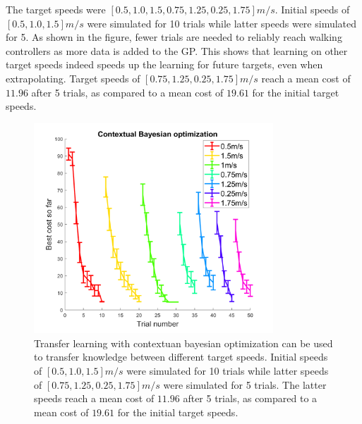 The target speeds were $[0.5, 1.0, 1.5, 0.75, 1.25, 0.25, 1.75] m/s$. Initial speeds of $[0.5, 1.0, 1.5]m/s$ were simulated for 10 trials while latter speeds were simulated for 5. 
As shown in the figure, fewer trials are needed to reliably reach walking controllers as more data is added to the GP. This shows that learning on other target speeds indeed speeds up the learning for future targets, even when extrapolating. Target speeds of  $[0.75, 1.25, 0.25, 1.75] m/s$ reach a mean cost of $11.96$ after 5 trials, as compared to a mean cost of $19.61$ for the initial target speeds.

\begin{figure}
    \centering
    \includegraphics[width = 0.8\textwidth]{img/contexxt_bo.png}
    \caption{Transfer learning with contextuan bayesian optimization can be used to transfer knowledge between different target speeds. Initial speeds of $[0.5, 1.0, 1.5]m/s$ were simulated for 10 trials while latter speeds of $[0.75, 1.25, 0.25, 1.75] m/s$ were simulated for 5 trials. The latter speeds reach a mean cost of $11.96$ after 5 trials, as compared to a mean cost of $19.61$ for the initial target speeds.}
    \label{fig:context}
\end{figure}